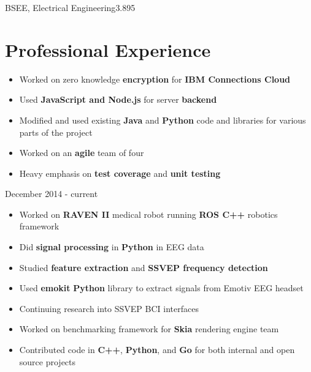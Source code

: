 \documentclass{my_resume}
\begin{document}

	{BSEE, Electrical Engineering}{3.895}

\section{Professional Experience}
\begin{itemize}
	\item Worked on zero knowledge \textbf{encryption} for 
		\textbf{IBM Connections Cloud}
	\item Used \textbf{JavaScript and Node.js} for server \textbf{backend}
	\item Modified and used existing \textbf{Java} and \textbf{Python} code
		and libraries for various parts of the project
	\item Worked on an \textbf{agile} team of four
    \item Heavy emphasis on \textbf{test coverage} and \textbf{unit testing}
\end{itemize}
	{December 2014 - current}
\begin{itemize}
	\item Worked on \textbf{RAVEN II} medical robot running \textbf{ROS C++}
		robotics framework
	\item Did \textbf{signal processing} in \textbf{Python} in EEG data
	\item Studied \textbf{feature extraction} and \textbf{SSVEP frequency detection}
	\item Used \textbf{emokit} \textbf{Python} library to extract signals from
		Emotiv EEG headset
    \item Continuing research into SSVEP BCI interfaces
\end{itemize}
\begin{itemize}
	\item Worked on benchmarking framework for \textbf{Skia} rendering engine team
	\item Contributed code in \textbf{C++}, \textbf{Python}, and \textbf{Go} for
		both internal and open source projects
\end{itemize}
\end{document}
